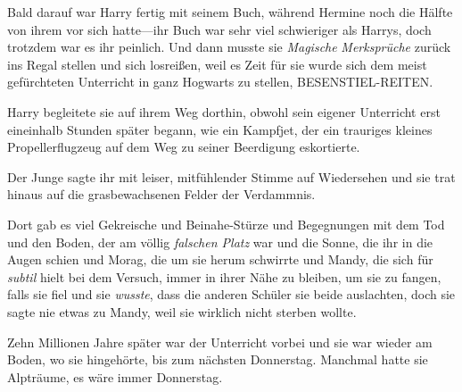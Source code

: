 Bald darauf war Harry fertig mit seinem Buch, während Hermine noch die Hälfte von ihrem vor sich hatte—ihr Buch war sehr viel schwieriger als Harrys, doch trotzdem war es ihr peinlich. Und dann musste sie \emph{Magische} \emph{Merksprüche} zurück ins Regal stellen und sich losreißen, weil es Zeit für sie wurde sich dem meist gefürchteten Unterricht in ganz Hogwarts zu stellen, BESENSTIEL-REITEN.

Harry begleitete sie auf ihrem Weg dorthin, obwohl sein eigener Unterricht erst eineinhalb Stunden später begann, wie ein Kampfjet, der ein trauriges kleines Propellerflugzeug auf dem Weg zu seiner Beerdigung eskortierte.

Der Junge sagte ihr mit leiser, mitfühlender Stimme auf Wiedersehen und sie trat hinaus auf die grasbewachsenen Felder der Verdammnis.

Dort gab es viel Gekreische und Beinahe-Stürze und Begegnungen mit dem Tod und den Boden, der am völlig \emph{falschen Platz} war und die Sonne, die ihr in die Augen schien und Morag, die um sie herum schwirrte und Mandy, die sich für \emph{subtil} hielt bei dem Versuch, immer in ihrer Nähe zu bleiben, um sie zu fangen, falls sie fiel und sie \emph{wusste}, dass die anderen Schüler sie beide auslachten, doch sie sagte nie etwas zu Mandy, weil sie wirklich nicht sterben wollte.

Zehn Millionen Jahre später war der Unterricht vorbei und sie war wieder am Boden, wo sie hingehörte, bis zum nächsten Donnerstag. Manchmal hatte sie Alpträume, es wäre immer Donnerstag.


